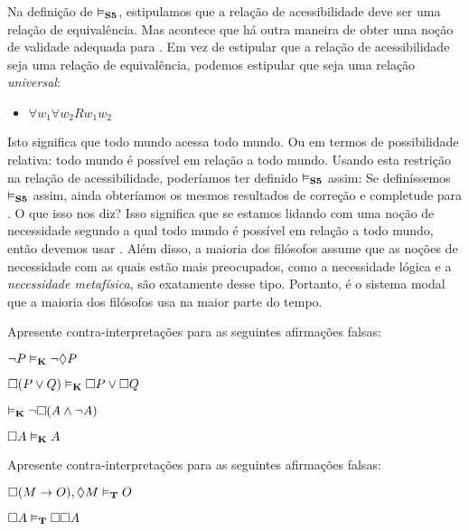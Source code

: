 Na definição de  $\vDash_{\mathbf{S5}} $, estipulamos que a relação de acessibilidade deve ser uma relação de equivalência. Mas acontece que há outra maneira de obter uma noção de validade adequada para \mlSfive. Em vez de estipular que a relação de acessibilidade seja uma relação de equivalência, podemos estipular que seja uma relação \emph{universal}:
\begin{itemize}
	\item $\forall w_1\forall w_2Rw_1w_2$
\end{itemize}
Isto significa  que todo mundo acessa todo mundo. Ou em termos de possibilidade relativa: todo mundo é possível em relação a todo mundo. Usando esta restrição na relação de acessibilidade, poderíamos ter definido  $\vDash_{\mathbf{S5}} $ assim:
Se definíssemos $\vDash_{\mathbf{S5}} $ assim, ainda obteríamos os mesmos resultados de correção e completude para \mlSfive{}. O que isso nos diz? Isso significa que se estamos lidando com uma noção de necessidade segundo a qual todo mundo é possível em relação a todo mundo, então devemos usar \mlSfive{}. Além disso, a maioria dos filósofos assume que as noções de necessidade com as quais estão mais preocupados, como a necessidade lógica e a \emph{necessidade metafísica}, são exatamente desse tipo. Portanto, \mlSfive{} é o sistema modal que a maioria dos filósofos usa na maior parte do tempo.
 

\practiceproblems

\problempart
Apresente contra-interpretações para as seguintes afirmações falsas:
\begin{earg}
	\item $\neg P \vDash_{\mathbf{K}} \neg\Diamond P$
	\item $\Box(P \vee Q)\vDash_{\mathbf{K}} \Box P \vee \Box Q$
	\item $\vDash_{\mathbf{K}} \neg \Box (A\wedge \neg A)$
	\item $\Box A\vDash_{\mathbf{K}} A$
\end{earg}

\problempart
Apresente contra-interpretações para as seguintes afirmações falsas:
\begin{earg}
	\item $\Box (M\rightarrow O),\Diamond M\vDash_{\mathbf{T}} O$
	\item $\Box A\vDash_{\mathbf{T}} \Box \Box A$
\end{earg}

